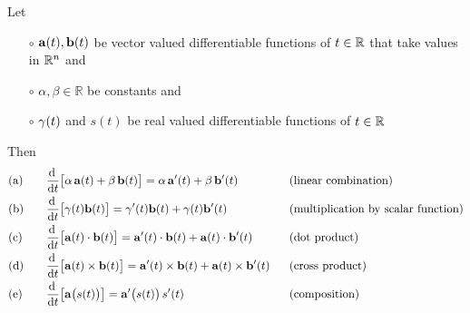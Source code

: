 \begin{theorem}\label{thm:DIFFalgebra}
Let 
\begin{itemize}\itemsep1pt \parskip0pt  %
\item[$\circ$]
$\mathbf{a}(t),\mathbf{b}(t)$ be vector valued differentiable functions of $t\in\mathbb{R}$
that take values in $\mathbb{R}^n$ and
\item[$\circ$]
 $\alpha,\beta \in \mathbb{R}$ be constants and 
\item[$\circ$]
 $\gamma(t)$ and $s(t)$ be real valued differentiable functions of $t\in\mathbb{R}$
\end{itemize}
Then
\begin{alignat*}{5}
&\text{(a)}\quad &&\diff{}{t}\big[\alpha\,\va(t)+\beta\,\vb(t)\big]
         =\alpha\,\va'(t)+\beta\,\vb'(t)
           &&\text{(linear combination)}
\\
&\text{(b)} &&\diff{}{t}\big[\ga(t)\vb(t)\big]
         =\ga'(t)\vb(t)+\ga(t)\vb'(t)
           &&\text{(multiplication by scalar function)}
\\
&\text{(c)} &&\diff{}{t}\big[\va(t)\cdot\vb(t)\big]
         =\va'(t)\cdot\vb(t)+\va(t)\cdot\vb'(t)
           &&\text{(dot product)}
\\
&\text{(d)} &&\diff{}{t}\big[\va(t)\times\vb(t)\big]
         =\va'(t)\times\vb(t)+\va(t)\times\vb'(t)
           \ \ &&\text{(cross product)}
\\
&\text{(e)} &&\diff{}{t}\big[\va\big(s(t)\big)\big]
         =\va'\big(s(t)\big)\,s'(t)
           &&\text{(composition)}
\end{alignat*}
\end{theorem}

